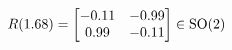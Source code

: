 \documentclass[preview]{standalone}
\begin{document}
\begin{align*}
\special{dvisvgm:raw <g id='unique000'>}R(1.68) = \begin{bmatrix} -0.11 & -0.99 \\ 0.99 & -0.11 \end{bmatrix} \in \text{SO}(2)\special{dvisvgm:raw </g>}
\end{align*}
\end{document}
